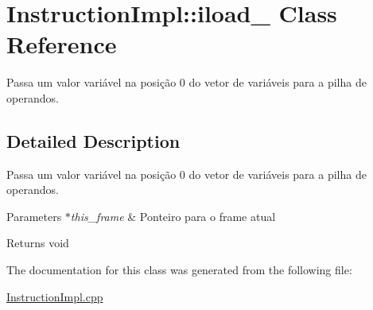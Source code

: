\hypertarget{class_instruction_impl_1_1iload__0}{}\section{Instruction\+Impl\+:\+:iload\+\_ Class Reference}
\label{class_instruction_impl_1_1iload__0}


Passa um valor variável na posição 0 do vetor de variáveis para a pilha de operandos.  




\subsection{Detailed Description}
Passa um valor variável na posição 0 do vetor de variáveis para a pilha de operandos. 


\begin{DoxyParams}{Parameters}
{\em $\ast$this\+\_\+frame} & Ponteiro para o frame atual \\
\hline
\end{DoxyParams}
\begin{DoxyReturn}{Returns}
void 
\end{DoxyReturn}


The documentation for this class was generated from the following file\+:\begin{DoxyCompactItemize}
\item 
\hyperlink{_instruction_impl_8cpp}{Instruction\+Impl.\+cpp}\end{DoxyCompactItemize}
